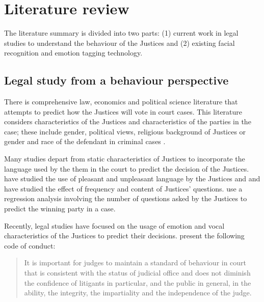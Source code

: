 \documentclass{monashthesis}
\begin{document}
\hypertarget{literature-review}{%
\section{Literature review}\label{literature-review}}

The literature summary is divided into two parts: (1) current work in legal studies to understand the behaviour of the Justices and (2) existing facial recognition and emotion tagging technology.

\hypertarget{legal-study-from-a-behaviour-perspective}{%
\subsection{Legal study from a behaviour perspective}\label{legal-study-from-a-behaviour-perspective}}

There is comprehensive law, economics and political science literature that attempts to predict how the Justices will vote in court cases. This literature considers characteristics of the Justices and characteristics of the parties in the case; these include gender, political views, religious background of Justices or gender and race of the defendant in criminal cases \autocites{Stuart1962}{Peter1984}{Combining1987}{Susan1988}{Steffensmeier2001}{Kulik2003}.

Many studies depart from static characteristics of Justices to incorporate the language used by the them in the court to predict the decision of the Justices.
\textcite{black2011emotions} have studied the use of pleasant and unpleasant language by the Justices and \textcite{Shullman2004illusion} and \textcite{johnson2009inquiring} have studied the effect of frequency and content of Justices' questions. \textcite{epstein2010inferring} use a regression analysis involving the number of questions asked by the Justices to predict the winning party in a case.

Recently, legal studies have focused on the usage of emotion and vocal characteristics of the Justices to predict their decisions. \textcite{judicalguid} present the following code of conduct:

\begin{quote}
It is important for judges to maintain a standard of behaviour in court that is consistent with the status of judicial office and does not diminish the confidence of litigants in particular, and the public in general, in the ability, the integrity, the impartiality and the independence of the judge.
\end{quote}
\end{document}
